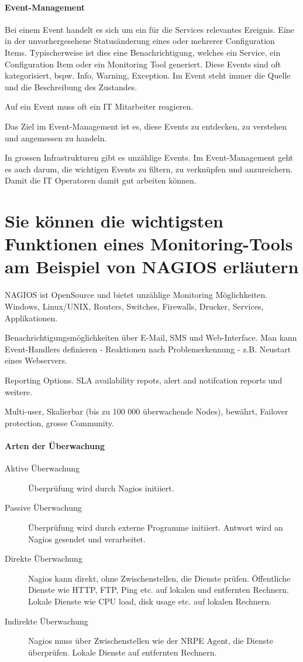 \paragraph{Event-Management}
Bei einem Event handelt es sich um ein für die Services relevantes Ereignis. Eine in der unvorhergesehene Statusänderung eines oder mehrerer Configuration Items. Typischerweise ist dies eine Benachrichtigung, welches ein Service, ein Configuration Item oder ein Monitoring Tool generiert. Diese Events sind oft kategorisiert, bspw. Info, Warning, Exception. Im Event steht immer die Quelle und die Beschreibung des Zustandes.

Auf ein Event muss oft ein IT Mitarbeiter reagieren. 

Das Ziel im Event-Management ist es, diese Events zu entdecken, zu verstehen und angemessen zu handeln.

In grossen Infrastrukturen gibt es unzählige Events. Im Event-Management geht es auch darum, die wichtigen Events zu filtern, zu verknüpfen und anzureichern. Damit die IT Operatoren damit gut arbeiten können.

\section{Sie können die wichtigsten Funktionen eines Monitoring-Tools am Beispiel von NAGIOS erläutern}

NAGIOS ist OpenSource und bietet unzählige Monitoring Möglichkeiten. Windows, Linux/UNIX, Routers, Switches, Firewalls, Drucker, Services, Applikationen.

Benachrichtigungsmöglichkeiten über E-Mail, SMS und Web-Interface. Man kann Event-Handlers definieren - Reaktionen nach Problemerkennung - z.B. Neustart eines Webservers.

Reporting Options. SLA availability repots, alert and notifcation reports und weitere.

Multi-user, Skalierbar (bis zu 100 000 überwachende Nodes), bewährt, Failover protection, grosse Community.

\paragraph{Arten der Überwachung}
\begin{description}
	\item[Aktive Überwachung] Überprüfung wird durch Nagios initiiert.
	\item[Passive Überwachung] Überprüfung wird durch externe Programme initiiert. Antwort wird an Nagios gesendet und verarbeitet.
	\item[Direkte Überwachung] Nagios kann direkt, ohne Zwischenstellen, die Dienste prüfen. Öffentliche Dienste wie HTTP, FTP, Ping etc. auf lokalen und entfernten Rechnern. Lokale Dienste wie CPU load, disk usage etc. auf lokalen Rechnern.
	\item[Indirekte Überwachung] Nagios muss über Zwischenstellen wie der NRPE Agent, die Dienste überprüfen. Lokale Dienste auf entfernten Rechnern.
\end{description}

